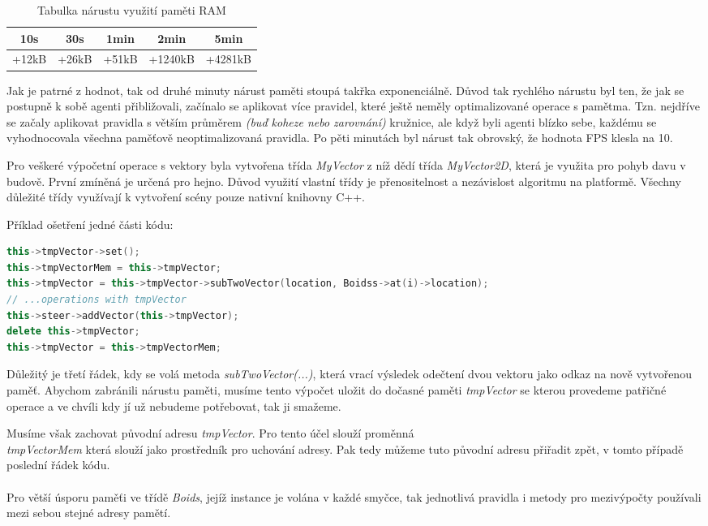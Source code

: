\documentclass[czech,public,dept460,male,cpdeclaration]{diploma}
\begin{document}
\begin{table}[H]
	\centering
	\caption{Tabulka nárustu využití paměti RAM}
	\label{tab:ramoptimalization}
	\renewcommand{\arraystretch}{1.5}
	\begin{tabular}{| c | c | c | c | c |}
		\hline
		10s & 30s & 1min & 2min & 5min\\\hline
		+12kB & +26kB & +51kB & +1240kB & +4281kB\\
		\hline
	\end{tabular}
\end{table}

Jak je patrné z hodnot, tak od druhé minuty nárust paměti stoupá takřka exponenciálně. Důvod tak rychlého nárustu byl ten, že jak se postupně k sobě agenti přibližovali, začínalo se aplikovat více pravidel, které ještě neměly optimalizované operace s pamětma. Tzn. nejdříve se začaly aplikovat pravidla s větším průměrem \textit{(buď koheze nebo zarovnání)} kružnice, ale když byli agenti blízko sebe, každému se vyhodnocovala všechna paměťově neoptimalizovaná pravidla.
Po pěti minutách byl nárust tak obrovský, že hodnota FPS klesla na 10. 

Pro veškeré výpočetní operace s vektory byla vytvořena třída \textit{MyVector} z níž dědí třída \textit{MyVector2D}, která je využita pro pohyb davu v budově. První zmíněná je určená pro hejno. Důvod využití vlastní třídy je přenositelnost a nezávislost algoritmu na platformě. Všechny důležité třídy využívají k vytvoření scény pouze nativní knihovny C++.

Příklad ošetření jedné části kódu:

\begin{lstlisting}[language=c++,label=src:memory elimination,caption=Ukázka eliminace nárustu paměti]
this->tmpVector->set();
this->tmpVectorMem = this->tmpVector;
this->tmpVector = this->tmpVector->subTwoVector(location, Boidss->at(i)->location);
// ...operations with tmpVector
this->steer->addVector(this->tmpVector);
delete this->tmpVector;
this->tmpVector = this->tmpVectorMem;
\end{lstlisting}

Důležitý je třetí řádek, kdy se volá metoda \textit{subTwoVector(...)}, která vrací výsledek odečtení dvou vektoru jako odkaz na nově vytvořenou paměť. Abychom zabránili nárustu paměti, musíme tento výpočet uložit do dočasné paměti \textit{tmpVector} se kterou provedeme patřičné operace a ve chvíli kdy jí už nebudeme potřebovat, tak ji smažeme.

Musíme však zachovat původní adresu \textit{tmpVector}. Pro tento účel slouží proměnná \\\textit{tmpVectorMem} která slouží jako prostředník pro uchování adresy. Pak tedy můžeme tuto původní adresu přiřadit zpět, v tomto případě poslední řádek kódu.
\\\\
Pro větší úsporu paměťi ve třídě \textit{Boids}, jejíž instance je volána v každé smyčce, tak jednotlivá pravidla i metody pro mezivýpočty používali mezi sebou stejné adresy pamětí.
\end{document}
